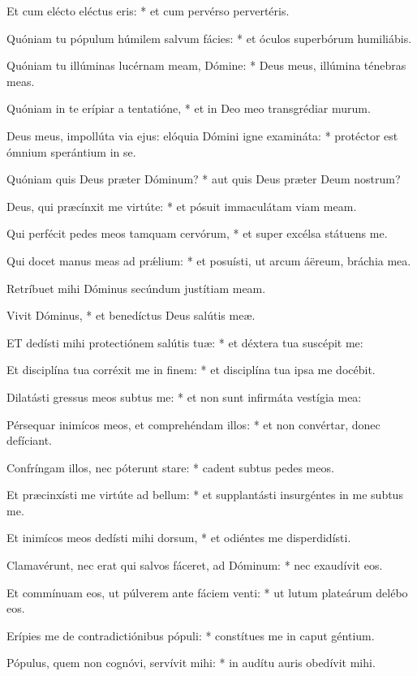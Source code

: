 Et cum elécto eléctus eris: * et cum pervérso pervertéris.

Quóniam tu pópulum húmilem salvum fácies: * et óculos superbórum humiliábis.

Quóniam tu illúminas lucérnam meam, Dómine: * Deus meus, illúmina ténebras meas.

Quóniam in te erípiar a tentatióne, * et in Deo meo transgrédiar murum.

Deus meus, impollúta via ejus: elóquia Dómini igne examináta: * protéctor est ómnium sperántium in se.

Quóniam quis Deus præter Dóminum? * aut quis Deus præter Deum nostrum?

Deus, qui præcínxit me virtúte: * et pósuit immaculátam viam meam.

Qui perfécit pedes meos tamquam cervórum, * et super excélsa státuens me.

Qui docet manus meas ad prǽlium: * et posuísti, ut arcum áëreum, bráchia mea.

 Retríbuet mihi Dóminus secúndum justítiam meam.

 Vivit Dóminus, * et benedíctus Deus salútis meæ.


\lettrine[lines=2]{E}{T} dedísti mihi protectiónem salútis tuæ: * et déxtera tua suscépit me:

Et disciplína tua corréxit me in finem: * et disciplína tua ipsa me docébit.

Dilatásti gressus meos subtus me: * et non sunt infirmáta vestígia mea:

Pérsequar inimícos meos, et comprehéndam illos: * et non convértar, donec defíciant.

Confríngam illos, nec póterunt stare: * cadent subtus pedes meos.

Et præcinxísti me virtúte ad bellum: * et supplantásti insurgéntes in me subtus me.

Et inimícos meos dedísti mihi dorsum, * et odiéntes me disperdidísti.

Clamavérunt, nec erat qui salvos fáceret, ad Dóminum: * nec exaudívit eos.

Et commínuam eos, ut púlverem ante fáciem venti: * ut lutum plateárum delébo eos.

Erípies me de contradictiónibus pópuli: * constítues me in caput géntium.

Pópulus, quem non cognóvi, servívit mihi: * in audítu auris obedívit mihi.

